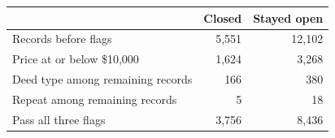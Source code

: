 \begin{tabular}{lrr}
\hline
 & Closed & Stayed open \\
\hline
Records before flags & 5,551 & 12,102 \\
Price at or below \$10,000 & 1,624 & 3,268 \\
Deed type among remaining records & 166 & 380 \\
Repeat among remaining records & 5 & 18 \\
Pass all three flags & 3,756 & 8,436 \\
\hline
\end{tabular}
